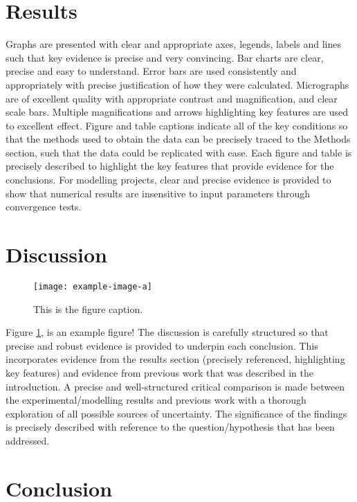 \documentclass{Academic}
\begin{document}
\section{Results}

Graphs are presented with clear and appropriate axes, legends, labels and lines such that key evidence is precise and very convincing.  Bar charts are clear, precise and easy to understand.
Error bars are used consistently and appropriately with precise justification of how they were calculated.
Micrographs are of excellent quality with appropriate contrast and magnification, and clear scale bars.  Multiple magnifications and arrows highlighting key features are used to excellent effect.
Figure and table captions indicate all of the key conditions so that the methods used to obtain the data can be precisely traced to the Methods section, such that the data could be replicated with ease.
Each figure and table is precisely described to highlight the key features that provide evidence for the conclusions.
For modelling projects, clear and precise evidence is provided to show that numerical results are insensitive to input parameters through convergence tests.


\section{Discussion}

\begin{figure}[!htb]%
    \centering
    \texttt{[image: example-image-a]}%
    \caption{This is the figure caption.}
    \label{fig:name_me_please}
\end{figure}

Figure \ref{fig:name_me_please}, is an example figure!
The discussion is carefully structured so that precise and robust evidence is provided to underpin each conclusion. This incorporates evidence from the results section (precisely referenced, highlighting key features) and evidence from previous work that was described in the introduction.  
A precise and well-structured critical comparison is made between the experimental/modelling results and previous work with a thorough exploration of all possible sources of uncertainty.
The significance of the findings is precisely described with reference to the question/hypothesis that has been addressed.


\section{Conclusion}
\end{document}
